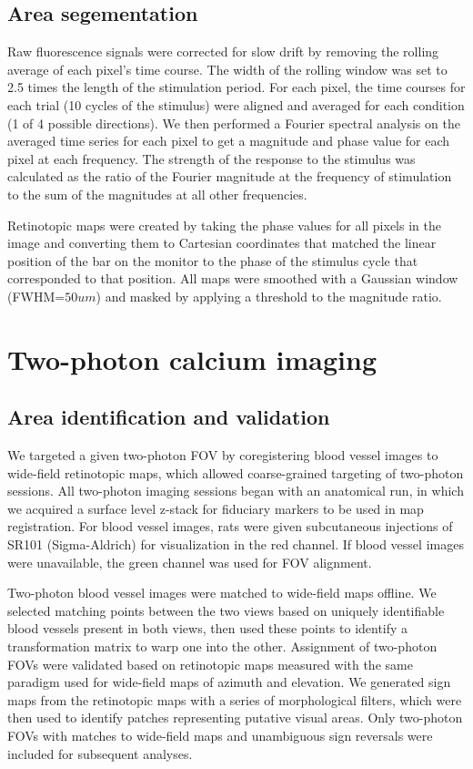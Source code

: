 \subsection{Area segementation}
Raw fluorescence signals were corrected for slow drift by removing the rolling average of each pixel’s time course. The width of the rolling window was set to 2.5 times the length of the stimulation period. For each pixel, the time courses for each trial (10 cycles of the stimulus) were aligned and averaged for each condition (1 of 4 possible directions). We then performed a Fourier spectral analysis on the averaged time series for each pixel to get a magnitude and phase value for each pixel at each frequency. The strength of the response to the stimulus was calculated as the ratio of the Fourier magnitude at the frequency of stimulation to the sum of the magnitudes at all other frequencies\cite{Kalatsky2003, OTHERS}.

Retinotopic maps were created by taking the phase values for all pixels in the image and converting them to Cartesian coordinates that matched the linear position of the bar on the monitor to the phase of the stimulus cycle that corresponded to that position. All maps were smoothed with a Gaussian window (FWHM=$50um$) and masked by applying a threshold to the magnitude ratio.  

\section{Two-photon calcium imaging}
\subsection{Area identification and validation}
We targeted a given two-photon FOV by coregistering blood vessel images to wide-field retinotopic maps, which allowed coarse-grained targeting of two-photon sessions. All two-photon imaging sessions began with an anatomical run, in which we acquired a surface level z-stack for fiduciary markers to be used in map registration. For blood vessel images, rats were given subcutaneous injections of SR101 (Sigma-Aldrich) for visualization in the red channel. If blood vessel images were unavailable, the green channel was used for FOV alignment. 

Two-photon blood vessel images were matched to wide-field maps offline. We selected matching points between the two views based on uniquely identifiable blood vessels present in both views, then used these points to identify a transformation matrix to warp one into the other. Assignment of two-photon FOVs were validated based on retinotopic maps measured with the same paradigm used for wide-field maps of azimuth and elevation. We generated sign maps from the retinotopic maps with a series of morphological filters\cite{Marshel2011, Garrett2014, Zhuang2017}, which were then used to identify patches representing putative visual areas. Only two-photon FOVs with matches to wide-field maps and unambiguous sign reversals were included for subsequent analyses. 


